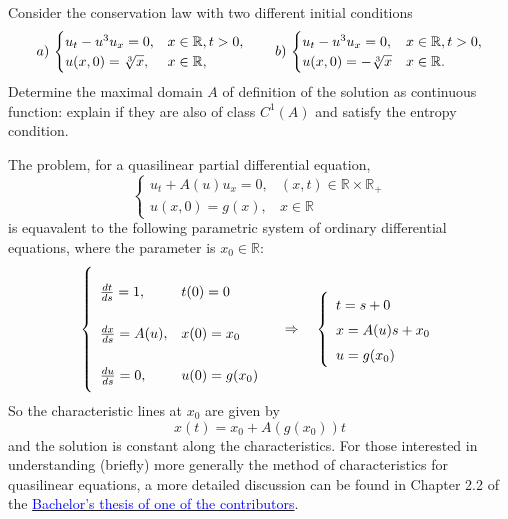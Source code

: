 \newpage
\begin{exercise}
    Consider the conservation law with two different initial conditions
    \begin{equation*}
        a)\,\begin{cases}
            u_t - u^3 u_x = 0,    & x \in \mathbb{R}, t > 0, \\
            u(x,0) = \sqrt[3]{x}, & x \in \mathbb{R},
        \end{cases}
        \qquad
        b)\,\begin{cases}
            u_t - u^3 u_x = 0,    & x \in \mathbb{R}, t > 0, \\
            u(x,0) = -\sqrt[3]{x} & x \in \mathbb{R}.
        \end{cases}
    \end{equation*}
    Determine the maximal domain \(A\) of definition of the solution as continuous function: explain if they are also of class \(C^1(A)\) and satisfy the entropy condition.
\end{exercise}
\begin{remark}
    The problem, for a quasilinear partial differential equation,
    \[
        \left\{
        \begin{array}{ll}
            u_t + A(u) u_x = 0, & (x, t) \in \mathbb{R} \times \mathbb{R}_+ \\
            u(x, 0) = g(x),     & x \in \mathbb{R}
        \end{array}
        \right.
    \]
    is equavalent to the following parametric system of ordinary differential
    equations, where the parameter is \(x_0 \in \mathbb{R}\):
    \[
        \renewcommand{\arraystretch}{2.5}
        \left\{
        \begin{array}{ll}

            \frac{dt}{ds} = 1,    & t(0) = 0      \\
            \frac{dx}{ds} = A(u), & x(0) = x_0    \\
            \frac{du}{ds} = 0,    & u(0) = g(x_0)
        \end{array}
        \right.
        \quad \Rightarrow \quad
        \renewcommand{\arraystretch}{1.5}
        \left\{
        \begin{array}{l}
            t = s + 0       \\
            x = A(u)s + x_0 \\
            u = g(x_0)
        \end{array}
        \right.
    \]
    So the characteristic lines at \(x_0\) are given by \[x(t) = x_0 + A(g(x_0))t\] and the solution is constant along the characteristics. For those interested in
    understanding (briefly) more generally the method of characteristics for
    quasilinear equations, a more detailed discussion can be found in Chapter 2.2
    of the \href{https://github.com/alessandropedone/cauchy-kowalevski-theorem}
    {\textcolor{blue}{Bachelor's thesis of one of the contributors}}.
\end{remark}
